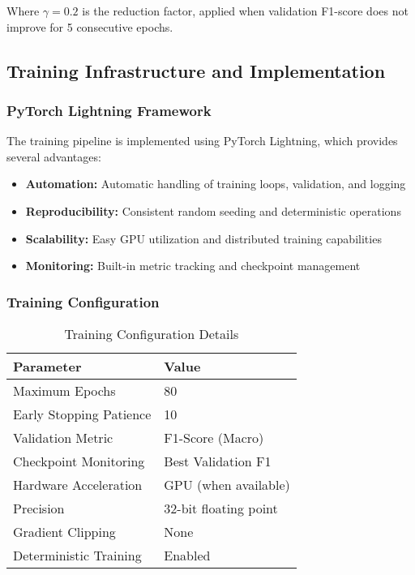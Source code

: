 \documentclass[11pt, a4paper]{article}
\begin{document}
Where $\gamma = 0.2$ is the reduction factor, applied when validation F1-score does not improve for 5 consecutive epochs.

\subsection{Training Infrastructure and Implementation}

\subsubsection{PyTorch Lightning Framework}

The training pipeline is implemented using PyTorch Lightning, which provides several advantages:

\begin{itemize}
    \item \textbf{Automation:} Automatic handling of training loops, validation, and logging
    \item \textbf{Reproducibility:} Consistent random seeding and deterministic operations
    \item \textbf{Scalability:} Easy GPU utilization and distributed training capabilities
    \item \textbf{Monitoring:} Built-in metric tracking and checkpoint management
\end{itemize}

\subsubsection{Training Configuration}

\begin{table}[H]
    \centering
    \caption{Training Configuration Details}
    \label{tab:training_config}
    \begin{tabular}{@{}ll@{}}
        \toprule
        \textbf{Parameter} & \textbf{Value} \\ \midrule
        Maximum Epochs & 80 \\
        Early Stopping Patience & 10 \\
        Validation Metric & F1-Score (Macro) \\
        Checkpoint Monitoring & Best Validation F1 \\
        Hardware Acceleration & GPU (when available) \\
        Precision & 32-bit floating point \\
        Gradient Clipping & None \\
        Deterministic Training & Enabled \\ \bottomrule
    \end{tabular}
\end{table}
\end{document}
